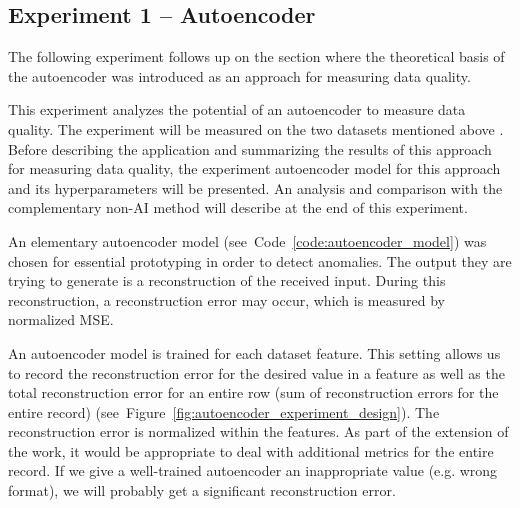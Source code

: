 			\subsection{Experiment 1 -- Autoencoder}
			\label{subsec:experiment_1_autoencoder}
							
				The following experiment follows up on the section  where the theoretical basis of the autoencoder was introduced as an approach for measuring data quality.
				
				This experiment analyzes the potential of an autoencoder to measure data quality. The experiment will be measured on the two datasets mentioned above . Before describing the application and summarizing the results of this approach for measuring data quality, the experiment autoencoder model for this approach and its hyperparameters will be presented. An analysis and comparison with the complementary non-AI method will describe at the end of this experiment.

				An elementary autoencoder model (see~Code~\ref{code:autoencoder_model}) was chosen for essential prototyping in order to detect anomalies. The output they are trying to generate is a reconstruction of the received input. During this reconstruction, a reconstruction error may occur, which is measured by normalized MSE.


				An autoencoder model is trained for each dataset feature. This setting allows us to record the reconstruction error for the desired value in a feature as well as the total reconstruction error for an entire row (sum of reconstruction errors for the entire record) (see~Figure~\ref{fig:autoencoder_experiment_design}). The reconstruction error is normalized within the features. As part of the extension of the work, it would be appropriate to deal with additional metrics for the entire record. If we give a well-trained autoencoder an inappropriate value (e.g. wrong format), we will probably get a significant reconstruction error.

							

